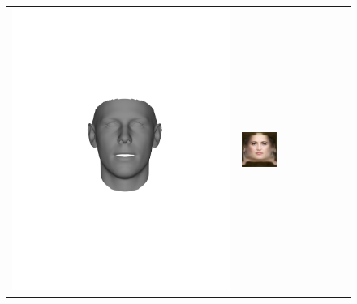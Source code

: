 \begin{figure}[t!]
\begin{center}
\begin{tabular}{ @{\hskip 1.5mm}c@{}c@{\hskip 1.5mm}c@{}c@{}c@{}c@{}c@{\hskip 1.5mm}c@{}}
\includegraphics[trim=150 250 150 250,clip, width=\afifthcolumn]{img/representation/pred_shape_Mustache.pdf} &
\includegraphics[width=\afifthcolumn]{img/representation/pred_tex_Pale_Skin.jpg} &

\end{tabular}
\end{center}
\end{figure}
